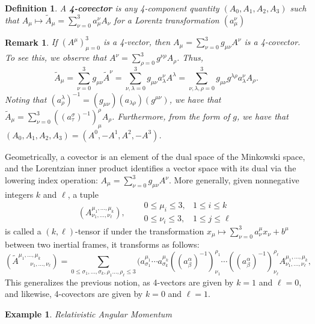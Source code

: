 \documentclass{article}
\newcommand{\al}{\alpha}
\newcommand{\be}{\beta}
\newtheorem{ex}{Example}
\newtheorem{defn}{Definition}
\newtheorem{rk}{Remark}
\begin{document}
\begin{defn}
    A \textbf{4-covector} is any 4-component quantity $(A_0,A_1,A_2,A_3)$ such that $A_\mu\mapsto \tilde A_\mu = \sum_{\nu = 0}^3 a_\mu^\nu A_\nu$ for a Lorentz transformation $(a_{\mu}^\nu)$
\end{defn}
\begin{rk}
    If $(A^\mu)_{\mu=0}^3$ is a 4-vector, then $A_\mu = \sum_{\nu=0}^3g_{\mu\nu}A^\nu$ is a 4-covector. To see this, we observe that $A^\nu = \sum_{\rho =0}^3 g^{\nu\rho}A_\rho$. Thus,
    \[\tilde A_\mu =\sum_{\nu =0}^3 g_{\mu\nu}\tilde A^\nu = \sum_{\nu,\lambda =0}^3g_{\mu\nu}a^\nu_\lambda A^\lambda = \sum_{\nu, \lambda,\rho=0}^3g_{\mu\nu}g^{\lambda\rho}a^\nu_\lambda A_\rho.\]
    Noting that $(a^\lambda_\rho)^{-1} = (g_{\mu\nu})(a_{\lambda\rho})(g^{\mu\nu})$, we have that $\tilde{A}_\mu = \sum_{\nu=0}^3 ((a^{\sigma}_\tau)^{-1})_{\mu}^\rho A_\rho$. Furthermore, from the form of $g$, we have that $(A_0,A_1,A_2,A_3) = (A^0,-A^1,A^2,-A^3)$. 
\end{rk}
Geometrically, a covector is an element of the dual space of the Minkowski space, and the Lorentzian inner product identifies a vector space with its dual via the lowering index operation: $A_\mu = \sum_{\nu=0}^3g_{\mu\nu}A^\nu$. More generally, given nonnegative integers $k$ and $\ell$, a tuple
\[\left(A^{\mu_1,\dots,\mu_k}_{\nu_1,\dots,\nu_\ell}\right),\quad{\begin{aligned}
    &0\leq \mu_i\leq 3, &1\leq i\leq k\\
    &0\leq \nu_i\leq 3, &1\leq j\leq \ell
\end{aligned}}\]
is called a $(k,\ell)$-tensor if under the transformation $x_\mu\mapsto \sum_{\nu = 0}^3 a^\mu_\nu x_\nu + b^\mu$ between two inertial frames, it transforms as follows:
\[\left(\tilde{A}^{\mu_1,\dots,\mu_k}_{\quad\quad\nu_1,\dots,\nu_\ell}\right) = \sum_{0\leq \sigma_1,\dots,\sigma_k,\rho_1\dots,\rho_\ell\leq 3} (a^{\mu_1}_{\sigma_1}\cdots a^{\mu_k}_{\sigma_k}\left((a^{\al}_{\be})^{-1}\right)_{\nu_1}^{\rho_1}\cdots \left((a^{\al}_{\be})^{-1}\right)_{\nu_\ell}^{\rho_\ell}A^{\mu_1,\dots,\mu_k}_{\nu_1,\dots,\nu_\ell},\]
This generalizes the previous notion, as 4-vectors are given by $k=1$ and $\ell = 0$, and likewise, 4-covectors are given by $k=0$ and $\ell =1$.
\begin{ex}
    Relativistic Angular Momentum
\end{ex}
\end{document}
